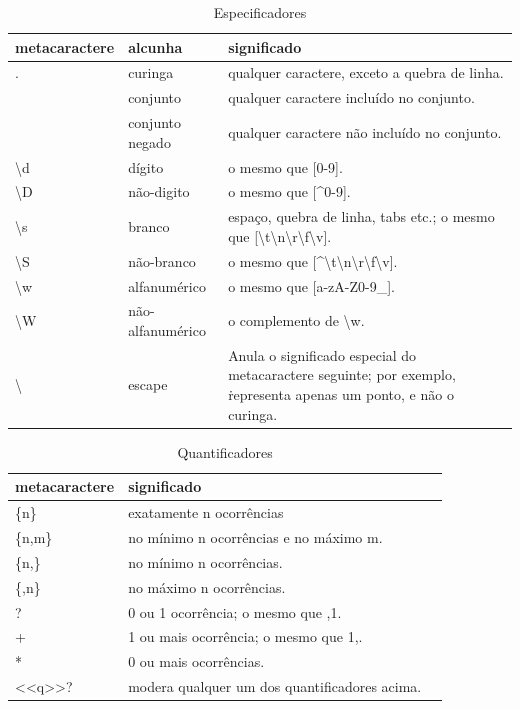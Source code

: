\begin{table}[htbp!]
  \centering
    \caption{Especificadores}
      \begin{tabularx}{\textwidth}{|X|X|X|}
      \hline
      \textbf{metacaractere} &  \textbf{alcunha} & \textbf{significado} \\
      \hline
      . & curinga & qualquer caractere, exceto a quebra de linha. \\
      \hline
      [...] & conjunto & qualquer caractere incluído no conjunto.\\
      \hline
      [\textasciicircum{}...] & conjunto negado & qualquer caractere não incluído no conjunto.\\
      \hline
      \textbackslash{}d & dígito & o mesmo que [0-9]. \\
      \hline
      \textbackslash{}D & não-digito & o mesmo que [\textasciicircum{}0-9]. \\
      \hline
      \textbackslash{}s & branco & espaço, quebra de linha, tabs etc.; o mesmo que [\textbackslash{}t\textbackslash{}n\textbackslash{}r\textbackslash{}f\textbackslash{}v]. \\
      \hline
      \textbackslash{}S & não-branco & o mesmo que [\textasciicircum{}\textbackslash{}t\textbackslash{}n\textbackslash{}r\textbackslash{}f\textbackslash{}v]. \\
      \hline
      \textbackslash{}w & alfanumérico & o mesmo que [a-zA-Z0-9\_]. \\
      \hline
      \textbackslash{}W & não-alfanumérico & o complemento de \textbackslash{}w. \\
      \hline
      \textbackslash{} & escape & Anula o significado especial do metacaractere seguinte; por exemplo, \. representa apenas um ponto, e não o curinga. \\
      \hline
      \end{tabularx}
  \label{Tabela5}
\end{table}

\begin{table}[htbp!]
  \centering
    \caption{Quantificadores}
      \begin{tabularx}{\textwidth}{|X|X|X|}
      \hline
      \textbf{metacaractere} &  \textbf{significado} \\
      \hline
      \{n\} & exatamente n ocorrências \\
      \hline
      \{n,m\} & no mínimo n ocorrências e no máximo m.\\
      \hline
      \{n,\} & no mínimo n ocorrências.\\
      \hline
      \{,n\} & no máximo n ocorrências. \\
      \hline
      ? & 0 ou 1 ocorrência; o mesmo que {,1}. \\
      \hline
      + & 1 ou mais ocorrência; o mesmo que {1,}. \\
      \hline
      * & 0 ou mais ocorrências. \\
      \hline
      <<q>>? & modera qualquer um dos quantificadores acima. \\
      \hline
      \end{tabularx}
  \label{Tabela1}
\end{table}


